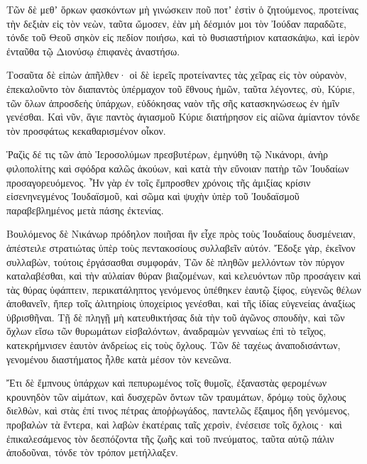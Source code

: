 {Τῶν δὲ μεθʼ ὅρκων φασκόντων μὴ γινώσκειν ποῦ ποτʼ ἐστὶν ὁ ζητούμενος,
προτείνας τὴν δεξιὰν εἰς τὸν νεὼν, ταῦτα ὤμοσεν, ἐὰν μὴ δέσμιόν μοι τὸν Ἰούδαν παραδῶτε, τόνδε τοῦ Θεοῦ σηκὸν εἰς πεδίον ποιήσω, καὶ τὸ θυσιαστήριον κατασκάψω, καὶ ἱερὸν ἐνταῦθα τῷ Διονύσῳ ἐπιφανὲς ἀναστήσω.
\par }{\PP {}Τοσαῦτα δὲ εἰπὼν ἀπῆλθεν· οἱ δὲ ἱερεῖς προτείναντες τὰς χεῖρας εἰς τὸν οὐρανὸν, ἐπεκαλοῦντο τὸν διαπαντὸς ὑπέρμαχον τοῦ ἔθνους ἡμῶν, ταῦτα λέγοντες,
σὺ, Κύριε, τῶν ὅλων ἀπροσδεὴς ὑπάρχων, εὐδόκησας ναὸν τῆς σῆς κατασκηνώσεως ἐν ἡμῖν γενέσθαι.
Καὶ νῦν, ἅγιε παντὸς ἁγιασμοῦ Κύριε διατήρησον εἰς αἰῶνα ἀμίαντον τόνδε τὸν προσφάτως κεκαθαρισμένον οἶκον.
\par }{\PP {}Ῥαζὶς δέ τις τῶν ἀπὸ Ἱεροσολύμων πρεσβυτέρων, ἐμηνύθη τῷ Νικάνορι, ἀνὴρ φιλοπολίτης καὶ σφόδρα καλῶς ἀκούων, καὶ κατὰ τὴν εὔνοιαν πατὴρ τῶν Ἰουδαίων προσαγορευόμενος.
Ἦν γὰρ ἐν τοῖς ἔμπροσθεν χρόνοις τῆς ἀμιξίας κρίσιν εἰσενηνεγμένος Ἰουδαϊσμοῦ, καὶ σῶμα καὶ ψυχὴν ὑπὲρ τοῦ Ἰουδαϊσμοῦ παραβεβλημένος μετὰ πάσης ἐκτενίας.
\par }{\PP {}Βουλόμενος δὲ Νικάνωρ πρόδηλον ποιῆσαι ἣν εἶχε πρὸς τοὺς Ἰουδαίους δυσμένειαν, ἀπέστειλε στρατιώτας ὑπὲρ τοὺς πεντακοσίους συλλαβεῖν αὐτόν.
Ἔδοξε γὰρ, ἐκεῖνον συλλαβὼν, τούτοις ἐργάσασθαι συμφοράν,
Τῶν δὲ πληθῶν μελλόντων τὸν πύργον καταλαβέσθαι, καὶ τὴν αὐλαίαν θύραν βιαζομένων, καὶ κελευόντων πῦρ προσάγειν καὶ τὰς θύρας ὑφάπτειν, περικατάληπτος γενόμενος ὑπέθηκεν ἑαυτῷ ξίφος,
εὐγενῶς θέλων ἀποθανεῖν, ἤπερ τοῖς ἀλιτηρίοις ὑποχείριος γενέσθαι, καὶ τῆς ἰδίας εὐγενείας ἀναξίως ὑβρισθῆναι.
Τῇ δὲ πληγῇ μὴ κατευθικτήσας διὰ τὴν τοῦ ἀγῶνος σπουδὴν, καὶ τῶν ὄχλων εἴσω τῶν θυρωμάτων εἰσβαλόντων, ἀναδραμὼν γενναίως ἐπὶ τὸ τεῖχος, κατεκρήμνισεν ἑαυτὸν ἀνδρείως εἰς τοὺς ὄχλους.
Τῶν δὲ ταχέως ἀναποδισάντων, γενομένου διαστήματος ἦλθε κατὰ μέσον τὸν κενεῶνα.
\par }{\PP {}Ἔτι δὲ ἔμπνους ὑπάρχων καὶ πεπυρωμένος τοῖς θυμοῖς, ἐξαναστὰς φερομένων κρουνηδὸν τῶν αἱμάτων, καὶ δυσχερῶν ὄντων τῶν τραυμάτων, δρόμῳ τοὺς ὄχλους διελθὼν, καὶ στὰς ἐπί τινος πέτρας ἀποῤῥωγάδος,
παντελῶς ἔξαιμος ἤδη γενόμενος, προβαλὼν τὰ ἔντερα, καὶ λαβὼν ἑκατέραις ταῖς χερσὶν, ἐνέσεισε τοῖς ὄχλοις· καὶ ἐπικαλεσάμενος τὸν δεσπόζοντα τῆς ζωῆς καὶ τοῦ πνεύματος, ταῦτα αὐτῷ πάλιν ἀποδοῦναι, τόνδε τὸν τρόπον μετήλλαξεν.

}
